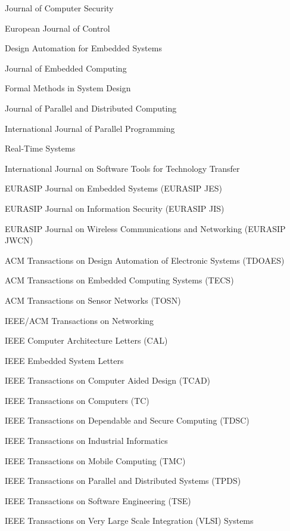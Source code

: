 \documentclass[draftcls,onecolumn,conference,12pt]{IEEEtran}
\begin{document}
Journal of Computer Security

European Journal of Control

Design Automation for Embedded Systems

Journal of Embedded Computing

Formal Methods in System Design

Journal of Parallel and Distributed Computing

International Journal of Parallel Programming

Real-Time Systems

International Journal on Software Tools for Technology Transfer

EURASIP Journal on Embedded Systems (EURASIP JES)

EURASIP Journal on Information Security (EURASIP JIS)

EURASIP Journal on Wireless Communications and Networking (EURASIP JWCN)

ACM Transactions on Design Automation of Electronic Systems (TDOAES)

ACM Transactions on Embedded Computing Systems (TECS)

ACM Transactions on Sensor Networks (TOSN)

IEEE/ACM Transactions on Networking

IEEE Computer Architecture Letters (CAL)

IEEE Embedded System Letters

IEEE Transactions on Computer Aided Design (TCAD)

IEEE Transactions on Computers (TC)

IEEE Transactions on Dependable and Secure Computing (TDSC)

IEEE Transactions on Industrial Informatics

IEEE Transactions on Mobile Computing (TMC)

IEEE Transactions on Parallel and Distributed Systems (TPDS)

IEEE Transactions on Software Engineering (TSE)

IEEE Transactions on Very Large Scale Integration (VLSI) Systems
\end{document}
